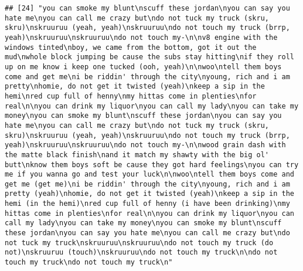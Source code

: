 \documentclass[]{article}
\begin{document}
\begin{verbatim}
## [24] "you can smoke my blunt\nscuff these jordan\nyou can say you hate me\nyou can call me crazy but\ndo not tuck my truck (skru, skru)\nskruuruu (yeah, yeah)\nskruuruu\ndo not touch my truck (brrp, yeah)\nskruuruu\nskruuruu\ndo not touch my-\n\nv8 engine with the windows tinted\nboy, we came from the bottom, got it out the mud\nwhole block jumping be cause the subs stay hitting\nif they roll up on me know i keep one tucked (ooh, yeah)\n\nwoo\ntell them boys come and get me\ni be riddin' through the city\nyoung, rich and i am pretty\nhomie, do not get it twisted (yeah)\nkeep a sip in the hemi\nred cup full of henny\nmy hittas come in plenties\nfor real\n\nyou can drink my liquor\nyou can call my lady\nyou can take my money\nyou can smoke my blunt\nscuff these jordan\nyou can say you hate me\nyou can call me crazy but\ndo not tuck my truck (skru, skru)\nskruuruu (yeah, yeah)\nskruuruu\ndo not touch my truck (brrp, yeah)\nskruuruu\nskruuruu\ndo not touch my-\n\nwood grain dash with the matte black finish\nand it match my shawty with the big ol' butt\nknow them boys soft be cause they got hard feelings\nyou can try me if you wanna go and test your luck\n\nwoo\ntell them boys come and get me (get me)\ni be riddin' through the city\nyoung, rich and i am pretty (yeah)\nhomie, do not get it twisted (yeah)\nkeep a sip in the hemi (in the hemi)\nred cup full of henny (i have been drinking)\nmy hittas come in plenties\nfor real\n\nyou can drink my liquor\nyou can call my lady\nyou can take my money\nyou can smoke my blunt\nscuff these jordan\nyou can say you hate me\nyou can call me crazy but\ndo not tuck my truck\nskruuruu\nskruuruu\ndo not touch my truck (do not)\nskruuruu (touch)\nskruuruu\ndo not touch my truck\n\ndo not touch my truck\ndo not touch my truck\n"                                                                                                                                                                                                                                                                                                                                                                                                                                                                                                                                                                                                                                                                                                                                                                                                                                                                                                                                                                                                                                                                                                                               

\end{verbatim}
\end{document}

